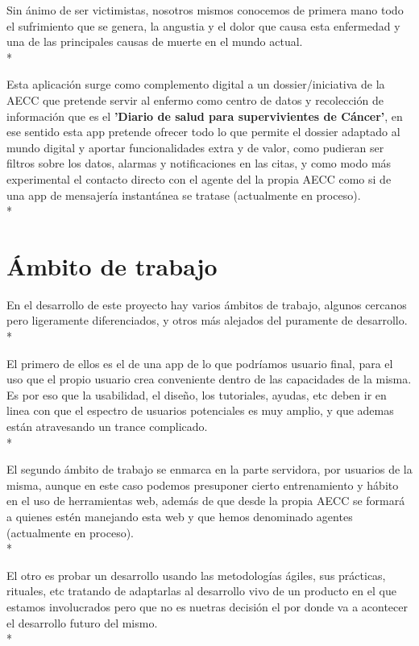 \documentclass[../pfc.tex]{subfiles}
\begin{document}
Sin ánimo de ser victimistas, nosotros mismos conocemos de primera mano todo el sufrimiento que se genera, la angustia y el dolor que causa esta enfermedad y una de las principales causas de muerte en el mundo actual.\\*

Esta aplicación surge como complemento digital a un dossier/iniciativa de la AECC que pretende servir al enfermo como centro de datos y recolección de información que es el \textbf{'Diario de salud para supervivientes de Cáncer'}, en ese sentido esta app pretende ofrecer todo lo que permite el dossier adaptado al mundo digital y aportar funcionalidades extra y de valor, como pudieran ser filtros sobre los datos, alarmas y notificaciones en las citas, y como modo más experimental el contacto directo con el agente del la propia AECC como si de una app de mensajería instantánea se tratase (actualmente en proceso). \\*


\section{Ámbito de trabajo}

En el desarrollo de este proyecto hay varios ámbitos de trabajo, algunos cercanos pero ligeramente diferenciados, y otros más alejados del puramente de desarrollo.\\*

El primero de ellos es el de una app de lo que podríamos usuario final, para el uso que el propio usuario crea conveniente dentro de las capacidades de la misma. Es por eso que la usabilidad, el diseño, los tutoriales, ayudas, etc deben ir en linea con que el espectro de usuarios potenciales es muy amplio, y que ademas están atravesando un trance complicado.\\*

El segundo ámbito de trabajo se enmarca en la parte servidora, por usuarios de la misma, aunque en este caso podemos presuponer cierto entrenamiento y hábito en el uso de herramientas web, además de que desde la propia AECC se formará a quienes estén manejando esta web y que hemos denominado agentes (actualmente en proceso).\\*

El otro es probar un desarrollo usando las metodologías ágiles, sus prácticas, rituales, etc tratando de adaptarlas al desarrollo vivo de un producto en el que estamos involucrados pero que no es nuetras decisión el por donde va a acontecer el desarrollo futuro del mismo.\\*
\end{document}
